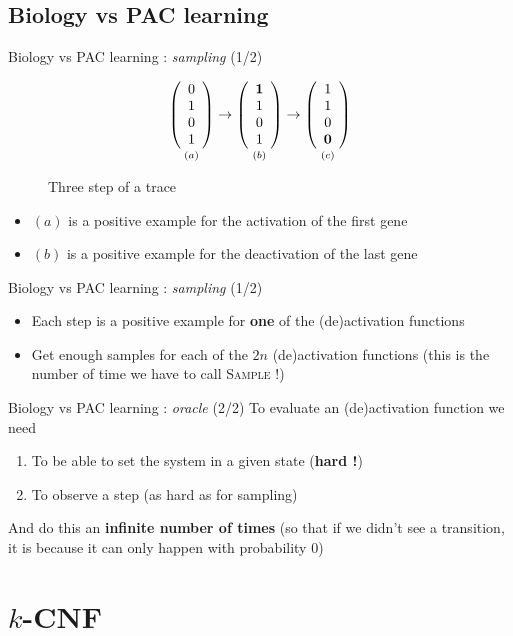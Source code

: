 \documentclass{beamer}
\begin{document}
\subsection{Biology vs PAC learning}
\begin{frame}{Biology vs PAC learning : \textit{sampling} (1/2)}
\begin{figure}
\[
\underset{\vspace{1em}(a)}{
\left(\begin{array}{c}
0\\ 1\\ 0\\ 1
\end{array}\right)}
\rightarrow
\underset{\vspace{1em}(b)}{
	\left(\begin{array}{c}
	\textbf{1}\\ 1\\ 0\\ 1
	\end{array}\right)}
\rightarrow
\underset{\vspace{1em}(c)}{
	\left(\begin{array}{c}
	1\\ 1\\ 0\\ \textbf{0}
	\end{array}\right)}
\]
\caption{Three step of a trace}
\end{figure}
\begin{itemize}
	\item $(a)$ is a positive example for the activation of the first gene
	\item $(b)$ is a positive example for the deactivation of the last gene
\end{itemize}
\end{frame}
\begin{frame}{Biology vs PAC learning : \textit{sampling} (1/2)}
\begin{itemize}
	\item Each step is a positive example for \textbf{one} of the (de)activation functions
	\item Get enough samples for each of the $2n$ (de)activation functions (this is the number of time we have to call \textsc{Sample} !)
\end{itemize}
\end{frame}
\begin{frame}{Biology vs PAC learning : \textit{oracle} (2/2)}
To evaluate an (de)activation function we need
\begin{enumerate}
	\item To be able to set the system in a given state (\textbf{hard !})
	\item To observe a step (as hard as for sampling)
\end{enumerate}
\pause
And do this an \textbf{infinite number of times} (so that if we didn't see a transition, it is because it can only happen with probability 0)
\end{frame}
\section{$k$-CNF}
\end{document}
